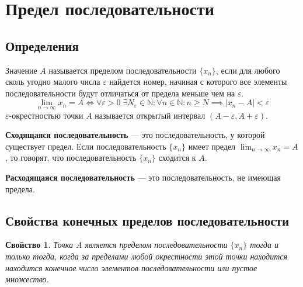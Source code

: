 \documentclass[a4paper,12pt,oneside]{extbook}
\theoremstyle{numbered}
\newtheorem{property}{Свойство}[section]
\theoremstyle{unnumbered}
\theoremstyle{named}
\theoremstyle{unnumbered}
\theoremstyle{named}
\theoremstyle{named}
\theoremstyle{named}
\begin{document}
\section{Предел последовательности}%
\label{sec:Предел последовательности}

\subsection{Определения}%
\label{sub:Определения}

\begin{siderules}
    Значение \(A\) называется пределом последовательности \(\{x_n\}\), если для любого сколь угодно малого числа \(\varepsilon\) найдется номер, начиная с которого все элементы последовательности будут отличаться от предела меньше чем на \(\varepsilon\).
    \[
        \lim_{n \to \infty}{x_n} = A \iff
        \forall \varepsilon > 0 \; \exists N_{\varepsilon} \in \mathbb{N}: \forall n \in \mathbb{N}: n \geq N \implies |x_n - A| < \varepsilon
    \]
    \(\varepsilon\)-окрестностью точки \(A\) называется открытый интервал \((A - \varepsilon, A + \varepsilon)\).
\end{siderules}

\begin{siderules}
    \textbf{Сходящаяся последовательность} — это последовательность, у которой существует предел. Если последовательность \(\{x_n\}\) имеет предел \(\displaystyle \lim_{n \to \infty}{x_n} = A\), то говорят, что последовательность \(\{x_n\}\) сходится к \(A\).
\end{siderules}

\begin{siderules}
    \textbf{Расходящаяся последовательность} — это последовательность, не имеющая предела.
\end{siderules}

\subsection{Свойства конечных пределов последовательности}%
\label{sub:Свойства конечных пределов последовательности}

\begin{property}
    Точка \(A\) является пределом последовательности \(\{x_n\}\) тогда и только тогда, когда за пределами любой окрестности этой точки находится находится конечное число элементов последовательности или пустое множество.
\end{property}
\end{document}
